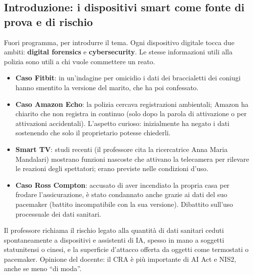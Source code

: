 \subsection{Introduzione: i dispositivi smart come fonte di prova e di rischio}
Fuori programma, per introdurre il tema. Ogni dispositivo digitale tocca due ambiti: \textbf{digital
forensics} e \textbf{cybersecurity}. Le stesse informazioni utili alla polizia sono utili a chi vuole
commettere un reato.
\begin{itemize}
  \item \textbf{Caso Fitbit}: in un'indagine per omicidio i dati dei braccialetti dei coniugi hanno
    smentito la versione del marito, che ha poi confessato.
  \item \textbf{Caso Amazon Echo}: la polizia cercava registrazioni ambientali; Amazon ha chiarito che non
    registra in continuo (solo dopo la parola di attivazione o per attivazioni accidentali). L'aspetto
    curioso: inizialmente ha negato i dati sostenendo che solo il proprietario potesse chiederli.
  \item \textbf{Smart TV}: studi recenti (il professore cita la ricercatrice Anna Maria Mandalari)
    mostrano funzioni nascoste che attivano la telecamera per rilevare le reazioni degli spettatori;
    erano previste nelle condizioni d'uso.
  \item \textbf{Caso Ross Compton}: accusato di aver incendiato la propria casa per frodare
    l'assicurazione, è stato condannato anche grazie ai dati del suo pacemaker (battito incompatibile con
    la sua versione). Dibattito sull'uso processuale dei dati sanitari.
\end{itemize}
Il professore richiama il rischio legato alla quantità di dati sanitari ceduti spontaneamente a
dispositivi e assistenti di IA, spesso in mano a soggetti statunitensi o cinesi, e la superficie
d'attacco offerta da oggetti come termostati o pacemaker. Opinione del docente: il CRA è più importante
di AI Act e NIS2, anche se meno ``di moda''.

